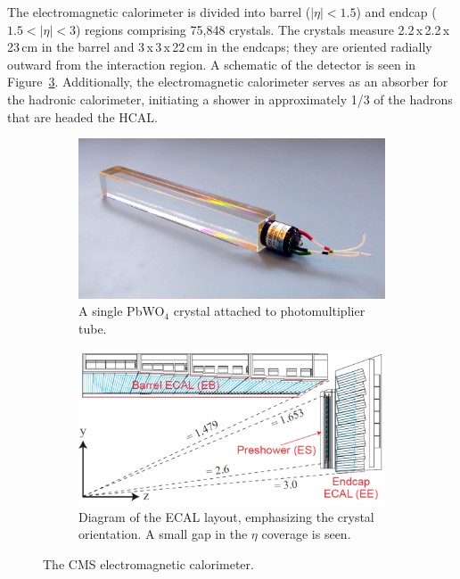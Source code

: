 The electromagnetic calorimeter is divided into barrel ($|\eta|<1.5$) and endcap ($1.5<|\eta|<3$) regions comprising 75,848 crystals. The crystals measure 2.2$\,$x$\,$2.2$\,$x$\,$23$\,$cm in the barrel and 3$\,$x$\,$3$\,$x$\,$22$\,$cm in the endcaps; they are oriented radially outward from the interaction region. A schematic of the detector is seen in Figure~\ref{fig:ecal}. Additionally, the electromagnetic calorimeter serves as an absorber for the hadronic calorimeter, initiating a shower in approximately 1/3 of the hadrons that are headed the HCAL.

\begin{figure}[hbp!]
\centering
\begin{subfigure}[c]{0.35\textwidth}
\includegraphics[width=\textwidth]{figs/ecalcrystal.jpg}
\caption{A single PbWO$_{4}$ crystal attached to photomultiplier tube.}
\label{fig:ecalcrystal}
\end{subfigure}
\begin{subfigure}[c]{0.625\textwidth}
\includegraphics[width=\textwidth]{figs/ecal.png}
\caption{Diagram of the ECAL layout, emphasizing the crystal orientation. A small gap in the $\eta$ coverage is seen.}
\label{fig:ecal}
\end{subfigure}
\caption{The CMS electromagnetic calorimeter.}
\end{figure}

